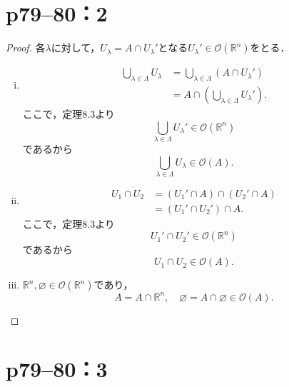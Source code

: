 \section*{p79--80：2}

\begin{leftbar}
    \begin{proof}
        各$\lambda$に対して，$U_\lambda= A \cap U_\lambda '$となる$ U_\lambda ' \in \mathcal{O} (\mathbb{R}^n)$をとる．
        \begin{enumerate}[(i)]
            \item
                  \begin{align*}
                      \bigcup_{\lambda \in \Lambda} U_\lambda & = \bigcup_{\lambda \in \Lambda} (A \cap U_\lambda ')  \\
                                                              & = A \cap (\bigcup_{\lambda \in \Lambda} U_\lambda ').
                  \end{align*}
                  ここで，定理8.3より
                  \[
                      \bigcup_{\lambda \in \Lambda} U_\lambda ' \in \mathcal{O} (\mathbb{R}^n)
                  \]
                  であるから
                  \[
                      \bigcup_{\lambda \in \Lambda} U_\lambda \in \mathcal{O} (A).
                  \]
            \item
                  \begin{align*}
                      U_1 \cap U_2 & = (U_1 ' \cap A) \cap (U_2 ' \cap A) \\
                                   & = (U_1 ' \cap U_2 ') \cap A.
                  \end{align*}
                  ここで，定理8.3より
                  \[
                      U_1 ' \cap U_2 ' \in \mathcal{O} (\mathbb{R}^n)
                  \]
                  であるから
                  \[
                      U_1 \cap U_2 \in \mathcal{O} (A).
                  \]
            \item
                  $\mathbb{R}^n, \varnothing \in \mathcal{O} (\mathbb{R}^n)$であり，
                  \[
                      A = A \cap \mathbb{R}^n, \quad \varnothing = A \cap \varnothing \in \mathcal{O} (A).
                  \]
        \end{enumerate}
    \end{proof}
\end{leftbar}


\section*{p79--80：3} \label{p79--80：3}

